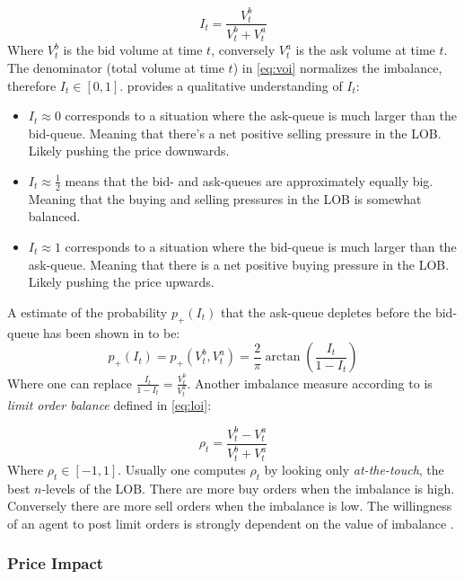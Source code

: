 \documentclass{kththesis}
\theoremstyle{definition}
\begin{document}
\begin{equation}
    I_t = \frac{V_{t}^{b}}{V_{t}^{b}+V_{t}^{a}}
    \label{eq:voi}
\end{equation}
Where $V_{t}^{b}$ is the bid volume at time $t$, conversely $V_{t}^{a}$ is the ask volume at time $t$. The denominator (total volume at time $t$) in \autoref{eq:voi} normalizes the imbalance, therefore $I_t \in [0, 1]$. \textcite{bouchaud2018trades} provides a qualitative understanding of $I_t$:
\begin{itemize}
    \item $I_t \approx 0$ corresponds to a situation where the ask-queue is much larger than the bid-queue. Meaning that there's a net positive selling pressure in the LOB. Likely pushing the price downwards.
    \item $I_t \approx \frac{1}{2}$ means that the bid- and ask-queues are approximately equally big. Meaning that the buying and selling pressures in the LOB is somewhat balanced.
    \item $I_t \approx 1$ corresponds to a situation where the bid-queue is much larger than the ask-queue. Meaning that there is a net positive buying pressure in the LOB. Likely pushing the price upwards.
\end{itemize}
A estimate of the probability $p_{+}(I_t)$ that the ask-queue depletes before the bid-queue has been shown in \parencite{bouchaud2018trades} to be:
\begin{equation}
    p_{+}(I_t) = p_{+}(V_{t}^{b}, V_{t}^{a}) = \frac{2}{\pi}\arctan{\left(\frac{I_t}{1-I_t}\right)}
\end{equation}
Where one can replace $\frac{I_t}{1-I_t} = \frac{V_{t}^{b}}{V_{t}^{a}}$. 
Another imbalance measure according to \textcite{cartea2015algorithmic} is \textit{limit order balance} defined in \autoref{eq:loi}:

\begin{equation}
    \rho_{t} = \frac{V_{t}^{b} - V_{t}^{a}}{V_{t}^{b}+V_{t}^{a}}
    \label{eq:loi}
\end{equation}
Where $\rho_t \in [-1,1]$. Usually one computes $\rho_t$ by looking only \textit{at-the-touch}, the best $n$-levels of the LOB. There are more buy orders when the imbalance is high. Conversely there are more sell orders when the imbalance is low. The willingness of an agent to post limit orders is strongly dependent on the value of imbalance \parencite{cartea2015algorithmic}.

\subsubsection*{Price Impact}
\end{document}
